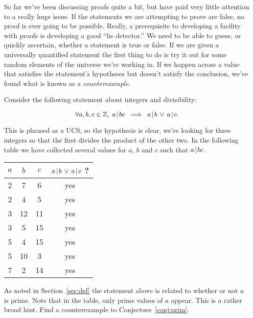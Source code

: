 So far we've been discussing proofs quite a bit, but have paid
very little attention to a really huge issue.  If the statements
we are attempting to prove are false, no proof is ever going to
be possible.  Really, a prerequisite to developing a facility with
proofs is developing a good ``lie detector.''   We need to be able 
to guess, or quickly ascertain, whether a statement is true or false.
If we are given a universally quantified statement the first thing to
do is try it out for some random elements of the universe we're working
in.  If we happen across a value that satisfies the statement's hypotheses
but doesn't satisfy the conclusion, we've found what is known as a 
\emph{counterexample}.  

Consider the following statement about integers and divisibility:

\begin{conj} \label{conj:prim}
\[ \forall a,b,c \in {\mathbb Z}, \; a \!\mid\! bc \; \implies \; a \!\mid\! b \,
\lor \, a \!\mid\! c. \]
\end{conj}

This is phrased as a UCS, so the hypothesis is clear, we're looking 
for three integers so that the first divides the product of the other
two. In the following table we have collected several values for
$a$, $b$ and $c$ such that $a \!\mid\! bc$.

\begin{center}
\begin{tabular}{c|c|c|c}
$a$ & $b$ & $c$ & $ a \!\mid\! b \, \lor \, a \!\mid\! c $ ? \\ \hline
2 & 7 & 6 & yes \\  
2 & 4 & 5 & yes \\  
3 & 12 & 11 & yes \\
3 & 5 & 15 & yes \\
5 & 4 & 15 & yes \\
5 & 10 & 3 & yes \\
7 & 2 & 14 & yes \\
\end{tabular}
\end{center}

\begin{exer} 
As noted in Section~\ref{sec:def} the statement above is related to
whether or not $a$ is prime.  Note that in the table, only prime
values of $a$ appear.  This is a rather broad hint.  Find a 
counterexample to Conjecture~\ref{conj:prim}.
\end{exer}

